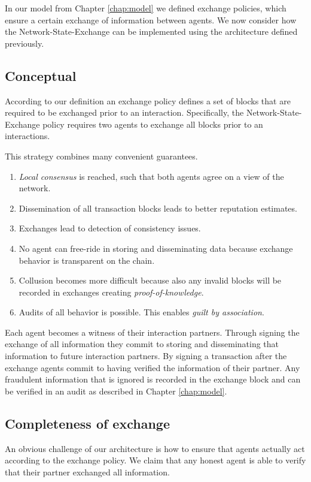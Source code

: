 In our model from Chapter \ref{chap:model} we defined exchange policies, which 
ensure a certain exchange of information between agents. We now consider how the
Network-State-Exchange can be implemented using the architecture defined previously. 

\subsection{Conceptual}
According to our definition an exchange policy defines a set of blocks that are required
to be exchanged prior to an interaction. Specifically, the
Network-State-Exchange policy requires two agents to exchange all blocks prior to an interactions.

This strategy combines many convenient guarantees. 
\begin{enumerate}
    \item \textit{Local consensus} is reached, such that both agents agree on a view of the network.
    \item Dissemination of all transaction blocks leads to better reputation estimates.
    \item Exchanges lead to detection of consistency issues.
    \item No agent can free-ride in storing and disseminating data because exchange behavior is 
    transparent on the chain.
    \item Collusion becomes more difficult because also any invalid blocks will be recorded in 
    exchanges creating \textit{proof-of-knowledge}.
    \item Audits of all behavior is possible. This enables \textit{guilt by association}.
\end{enumerate}

Each agent becomes a witness of their interaction partners. Through signing the exchange of all 
information they commit to storing and disseminating that information to future interaction partners.
By signing a transaction after the exchange agents commit to having verified the information of their
partner. Any fraudulent information that is ignored is recorded in the exchange block and can be 
verified in an audit as described in Chapter \ref{chap:model}.

\subsection{Completeness of exchange}
An obvious challenge of our architecture is how to ensure that agents actually act according to the
exchange policy. We claim that any honest agent is able to verify that their partner exchanged all 
information.

